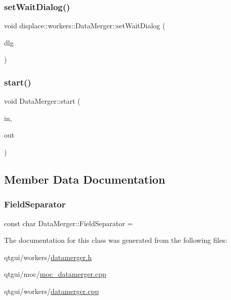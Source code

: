 \subsubsection{\texorpdfstring{setWaitDialog()}{setWaitDialog()}}
{\footnotesize\ttfamily void displace\+::workers\+::\+Data\+Merger\+::set\+Wait\+Dialog (\begin{DoxyParamCaption}\item[{\mbox{\hyperlink{class_wait_dialog}{Wait\+Dialog}} $\ast$}]{dlg }\end{DoxyParamCaption})\hspace{0.3cm}{\ttfamily [inline]}}

\mbox{\label{classdisplace_1_1workers_1_1_data_merger_a5068538e1910ff25af664f2688ba0ff5}} 
\subsubsection{\texorpdfstring{start()}{start()}}
{\footnotesize\ttfamily void Data\+Merger\+::start (\begin{DoxyParamCaption}\item[{Q\+String}]{in,  }\item[{Q\+String}]{out }\end{DoxyParamCaption})}



\subsection{Member Data Documentation}
\mbox{\label{classdisplace_1_1workers_1_1_data_merger_a3cc15967d51577d68151d7a4afc8d6fc}} 
\subsubsection{\texorpdfstring{FieldSeparator}{FieldSeparator}}
{\footnotesize\ttfamily const char Data\+Merger\+::\+Field\+Separator = \textquotesingle{} \textquotesingle{}\hspace{0.3cm}{\ttfamily [static]}}



The documentation for this class was generated from the following files\+:\begin{DoxyCompactItemize}
\item 
qtgui/workers/\mbox{\hyperlink{datamerger_8h}{datamerger.\+h}}\item 
qtgui/moc/\mbox{\hyperlink{moc__datamerger_8cpp}{moc\+\_\+datamerger.\+cpp}}\item 
qtgui/workers/\mbox{\hyperlink{datamerger_8cpp}{datamerger.\+cpp}}\end{DoxyCompactItemize}
